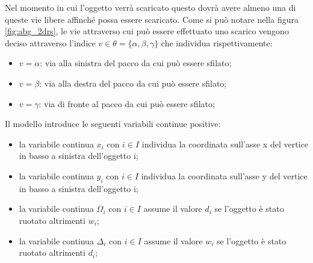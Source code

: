 Nel momento in cui l'oggetto verrà scaricato questo dovrà avere almeno una di queste vie libere affinché possa essere scaricato.
Come si può notare nella figura \ref{fig:abg_2drs}, le vie attraverso cui può essere effettuato uno scarico vengono deciso attraverso l'indice $v \in \theta = \{\alpha,\beta,\gamma\}$ che individua rispettivamente:
\begin{itemize}
	\item $v = \alpha$: via alla sinistra del pacco da cui può essere sfilato; 
	\item $v = \beta$: via alla destra del pacco da cui può essere sfilato; 
	\item $v = \gamma$: via di fronte al pacco da cui può essere sfilato; 
\end{itemize}

\newpage
Il modello introduce le seguenti variabili continue positive:
\begin{itemize}
	\item la variabile continua $x_{i}$ con $i \in I$ individua la coordinata sull'asse x del vertice in basso a sinistra dell'oggetto i;
	\item la variabile continua $y_{i}$ con $i \in I$ individua la coordinata sull'asse y del vertice in basso a sinistra dell'oggetto i;
	\item la variabile continua $\Omega_{i}$ con $i \in I$ assume il valore $d_i$ se l'oggetto è stato ruotato altrimenti $w_i$;
	\item la variabile continua $\Delta_{i}$ con $i \in I$ assume il valore $w_i$ se l'oggetto è stato ruotato altrimenti $d_i$;
\end{itemize}

